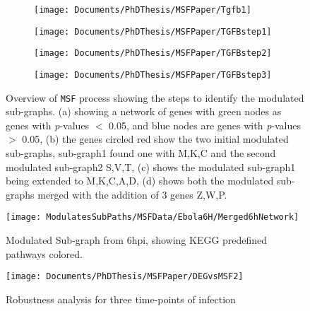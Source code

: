 \documentclass[twocolumn]{article}
\begin{document}
\begin{figure*}[ht!]
	
	\begin{subfigure}{.5\textwidth}
		\centering
		\texttt{[image: Documents/PhDThesis/MSFPaper/Tgfb1]} 
		\caption{}
	\end{subfigure}
	\begin{subfigure}{.5\textwidth}
		\centering
		\texttt{[image: Documents/PhDThesis/MSFPaper/TGFBstep1]}
		\caption{}
	\end{subfigure}
	\begin{subfigure}{.5\textwidth}
		\centering
		\texttt{[image: Documents/PhDThesis/MSFPaper/TGFBstep2]} 
		\caption{}
	\end{subfigure}
	\begin{subfigure}{.5\textwidth}
		\centering
		\texttt{[image: Documents/PhDThesis/MSFPaper/TGFBstep3]}
		\caption{}
	\end{subfigure}
	\caption{Overview of \texttt{MSF} process showing the steps to identify the modulated sub-graphs. (a) showing a network of genes with green nodes as genes with \textit{p}-values $< $ 0.05, and blue nodes are genes with \textit{p}-values $>$ 0.05, (b) the genes circled red show the two initial modulated sub-graphs, sub-graph1 found one with M,K,C and the second modulated sub-graph2 S,V,T, (c) shows the modulated sub-graph1 being extended to M,K,C,A,D, (d) shows both the modulated sub-graphs merged with the addition of 3 genes Z,W,P.}
\end{figure*}

\begin{figure*}
	\centering
	\texttt{[image: ModulatesSubPaths/MSFData/Ebola6H/Merged6hNetwork]}
	\caption{Modulated Sub-graph from 6hpi, showing KEGG predefined pathways colored.}
	\label{fig:merged6hnetwork}
\end{figure*}


\begin{figure*}[p]
	\texttt{[image: Documents/PhDThesis/MSFPaper/DEGvsMSF2]}
	\caption{Robustness analysis for three time-points of infection}
	\label{fig:degvsmsf2}
\end{figure*}
\end{document}
